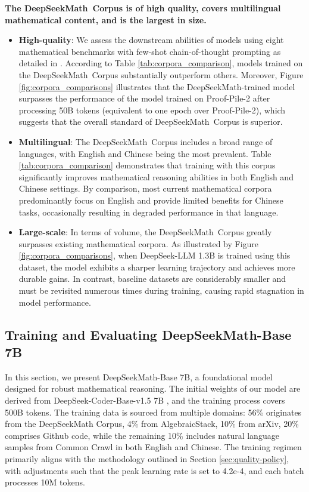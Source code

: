 \begin{itemize}[topsep=0pt]
\textbf{The DeepSeekMath~Corpus is of high quality, covers multilingual mathematical content, and is the largest in size.}

\begin{itemize}[topsep=0pt]
    \item \textbf{High-quality}:
    We assess the downstream abilities of models using eight mathematical benchmarks with few-shot chain-of-thought prompting as detailed in \cite{cot}. According to Table \ref{tab:corpora_comparison}, models trained on the DeepSeekMath~Corpus substantially outperform others. Moreover, Figure \ref{fig:corpora_comparisons} illustrates that the DeepSeekMath-trained model surpasses the performance of the model trained on Proof-Pile-2 after processing 50B tokens (equivalent to one epoch over Proof-Pile-2), which suggests that the overall standard of DeepSeekMath~Corpus is superior.
    \item \textbf{Multilingual}:
    The DeepSeekMath~Corpus includes a broad range of languages, with English and Chinese being the most prevalent. Table \ref{tab:corpora_comparison} demonstrates that training with this corpus significantly improves mathematical reasoning abilities in both English and Chinese settings. By comparison, most current mathematical corpora predominantly focus on English and provide limited benefits for Chinese tasks, occasionally resulting in degraded performance in that language.
    \item \textbf{Large-scale}:
    In terms of volume, the DeepSeekMath~Corpus greatly surpasses existing mathematical corpora. As illustrated by Figure \ref{fig:corpora_comparisons}, when DeepSeek-LLM 1.3B is trained using this dataset, the model exhibits a sharper learning trajectory and achieves more durable gains. In contrast, baseline datasets are considerably smaller and must be revisited numerous times during training, causing rapid stagnation in model performance.
\end{itemize}

\subsection{Training and Evaluating DeepSeekMath-Base 7B}

In this section, we present DeepSeekMath-Base 7B, a foundational model designed for robust mathematical reasoning. The initial weights of our model are derived from DeepSeek-Coder-Base-v1.5 7B \citep{deepseek-coder}, and the training process covers 500B tokens. The training data is sourced from multiple domains: 56\% originates from the DeepSeekMath Corpus, 4\% from AlgebraicStack, 10\% from arXiv, 20\% comprises Github code, while the remaining 10\% includes natural language samples from Common Crawl in both English and Chinese. The training regimen primarily aligns with the methodology outlined in Section \ref{sec:quality-policy}, with adjustments such that the peak learning rate is set to 4.2e-4, and each batch processes 10M tokens.


\end{itemize}
